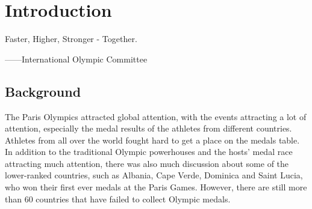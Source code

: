 \documentclass{mcmthesis}
\begin{document}
\begin{abstract}
    {\bf For issue five}, during the modeling process for the above issues, we identified some strategies that can help National Olympic Committees to increase their medal count. For example, as women's participation increases, National Olympic Committees can focus on mixed-gender events to increase their chances of winning. If a country is the host nation, it can apply to add domestic advantage events, optimize infrastructure, and increase financial support to leverage the home advantage and increase medal count. For events that are not monopolized by a few countries, strong nations should analyze these events and invest in cultivating the next generation of athletes, while emerging sports nations can achieve breakthroughs in these non-monopolized events by precisely targeting projects and attracting in excellent coaches.   
    \begin{keywords}
        Prediction, LSTM, Random Forest, Olympic Games, Performance Modeling, Graph Theory
\end{keywords}
\end{abstract}


\maketitle

\tableofcontents
\thispagestyle{empty}

\newpage
\section{Introduction}
Faster, Higher, Stronger - Together.

\hfill ——International Olympic Committee

\subsection{Background}%
The Paris Olympics attracted global attention, with the events attracting a lot of attention, especially the medal results of the athletes from different countries. Athletes from all over the world fought hard to get a place on the medals table. In addition to the traditional Olympic powerhouses and the hosts' medal race attracting much attention, there was also much discussion about some of the lower-ranked countries, such as Albania, Cape Verde, Dominica and Saint Lucia, who won their first ever medals at the Paris Games. However, there are still more than 60 countries that have failed to collect Olympic medals.
\end{document}
